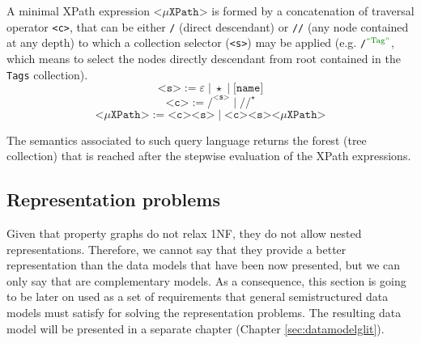 \begin{definition}
	\label{def:minxpath}
	A minimal XPath expression $\texttt{<}\mu\texttt{XPath}\texttt{>}$ is formed by a concatenation of traversal operator \texttt{<c>}, that can be either \texttt{/} (direct descendant) or \texttt{//} (any node contained at any depth) to which a collection selector (\texttt{<s>}) may be applied (e.g. \texttt{/$^{\mstr{Tag}}$}, which means to select the nodes directly descendant from root contained in the \texttt{Tags} collection). 
	\[\texttt{<s>}:=\varepsilon\; |\; \star\;|\;\texttt{[name]}\]
	\[\texttt{<c>}:=\texttt{/}^\texttt{<s>}\;|\;\texttt{//}^\star\]
	\[\texttt{<}\mu\texttt{XPath}\texttt{>} :=\texttt{<c>}\texttt{<s>}\;|\;\texttt{<c>}\texttt{<s>}\texttt{<}\mu\texttt{XPath}\texttt{>}\]
\end{definition}

The semantics associated to such query language \cite{Wadler00} returns the forest (tree collection) that is reached after the stepwise evaluation of the XPath expressions.


\subsection{Representation problems}\label{sec:semireprproblems}
Given that property graphs do not relax 1NF, they do not allow nested representations. Therefore, we cannot say that they provide a better representation than the data models that have been now presented, but we can only say that are complementary models. As a consequence, this section is going to be later on used as a set of requirements that general semistructured data models must satisfy for solving the representation problems. The resulting data model will be presented in a separate chapter (Chapter \vref{sec:datamodelglit}).

